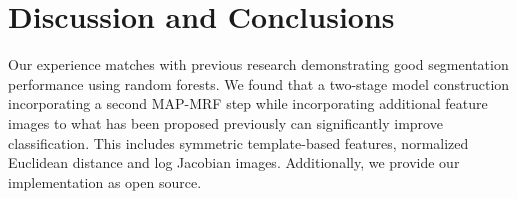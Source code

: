 \documentclass{llncs}
\begin{document}
\section{Discussion and Conclusions}

Our experience matches with previous research demonstrating good segmentation performance using random forests.  We found that a two-stage model construction incorporating a second MAP-MRF step while incorporating additional feature images to what has been proposed previously can significantly improve classification.  This includes symmetric template-based features, normalized Euclidean distance and log Jacobian images.  Additionally, we provide our implementation as open source.



\end{document}

